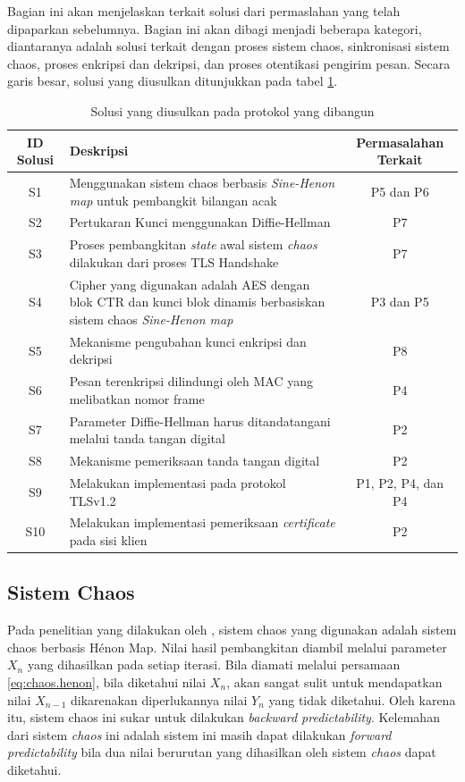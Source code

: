 Bagian ini akan menjelaskan terkait solusi dari permaslahan yang telah dipaparkan sebelumnya. Bagian ini akan dibagi menjadi beberapa kategori, diantaranya adalah solusi terkait dengan proses sistem chaos, sinkronisasi sistem chaos, proses enkripsi dan dekripsi, dan proses otentikasi pengirim pesan. Secara garis besar, solusi yang diusulkan ditunjukkan pada tabel \ref{tab:solusi}.

\begin{table}[!h]
  \centering
  \caption{Solusi yang diusulkan pada protokol yang dibangun} \label{tab:solusi}
  \begin{tabular}{|c|p{6cm}|c|}
    \hline
    \textbf{ID Solusi} & \textbf{Deskripsi} & \textbf{Permasalahan Terkait} \\
    \hline
    S1 & Menggunakan sistem chaos berbasis \emph{Sine-Henon map} untuk pembangkit bilangan acak & P5 dan P6 \\ \hline
    S2 & Pertukaran Kunci menggunakan Diffie-Hellman & P7 \\ \hline
    S3 & Proses pembangkitan \emph{state} awal sistem \emph{chaos} dilakukan dari proses TLS Handshake & P7 \\ \hline
    S4 & Cipher yang digunakan adalah AES dengan blok CTR dan kunci blok dinamis berbasiskan sistem chaos \emph{Sine-Henon map} & P3 dan P5 \\ \hline
    S5 & Mekanisme pengubahan kunci enkripsi dan dekripsi & P8 \\ \hline
    S6 & Pesan terenkripsi dilindungi oleh MAC yang melibatkan nomor frame & P4 \\ \hline
    S7 & Parameter Diffie-Hellman harus ditandatangani melalui tanda tangan digital & P2 \\ \hline
    S8 & Mekanisme pemeriksaan tanda tangan digital & P2 \\ \hline
    S9 & Melakukan implementasi pada protokol TLSv1.2 & P1, P2, P4, dan P4 \\ \hline
    S10 & Melakukan implementasi pemeriksaan \emph{certificate} pada sisi klien & P2 \\ \hline
  \end{tabular}
\end{table}

\subsection{Sistem Chaos}

Pada penelitian yang dilakukan oleh \textcite{lin2021}, sistem chaos yang digunakan adalah sistem chaos berbasis Hénon Map. Nilai hasil pembangkitan diambil melalui parameter $X_n$ yang dihasilkan pada setiap iterasi. Bila diamati melalui persamaan \ref{eq:chaos.henon}, bila diketahui nilai $X_n$, akan sangat sulit untuk mendapatkan nilai $X_{n-1}$ dikarenakan diperlukannya nilai $Y_n$ yang tidak diketahui. Oleh karena itu, sistem chaos ini sukar untuk dilakukan \emph{backward predictability}. Kelemahan dari sistem \emph{chaos} ini adalah sistem ini masih dapat dilakukan \emph{forward predictability} bila dua nilai berurutan yang dihasilkan oleh sistem \emph{chaos} dapat diketahui. 

